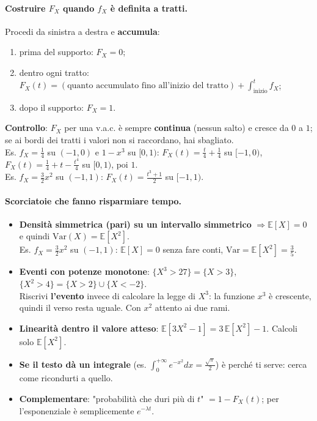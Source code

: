 \documentclass[12pt]{extarticle} %
\begin{document}
\paragraph{Costruire $F_X$ quando $f_X$ è definita a tratti.} Procedi da sinistra a destra e \textbf{accumula}:
\begin{enumerate}
    \item prima del supporto: $F_X = 0$;
    \item dentro ogni tratto: $F_X(t) = (\text{quanto accumulato fino all'inizio del tratto}) + \int_{\text{inizio}}^{t} f_X$;
    \item dopo il supporto: $F_X = 1$.
\end{enumerate}
{\footnotesize \textbf{Controllo}: $F_X$ per una v.a.c. è sempre \textbf{continua} (nessun salto) e cresce da $0$ a $1$; se ai bordi dei tratti i valori non si raccordano, hai sbagliato. \\
Es. $f_X = \frac14$ su $(-1,0)$ e $1-x^3$ su $[0,1)$: \; $F_X(t) = \frac{t}{4} + \frac14$ su $[-1,0)$, \; $F_X(t) = \frac14 + t - \frac{t^4}{4}$ su $[0,1)$, poi $1$. \\
Es. $f_X = \frac32 x^2$ su $(-1,1)$: \; $F_X(t) = \frac{t^3+1}{2}$ su $[-1,1)$.}

\paragraph{Scorciatoie che fanno risparmiare tempo.}
\begin{itemize}
    \item \textbf{Densità simmetrica (pari) su un intervallo simmetrico} $\Rightarrow \mathbb{E}[X] = 0$ e quindi $\mathrm{Var}(X) = \mathbb{E}[X^2]$. \\ {\footnotesize Es. $f_X = \frac32 x^2$ su $(-1,1)$: $\mathbb{E}[X]=0$ senza fare conti, $\mathrm{Var} = \mathbb{E}[X^2] = \frac35$.}
    \item \textbf{Eventi con potenze monotone}: $\{X^3 > 27\} = \{X > 3\}$, $\{X^2 > 4\} = \{X>2\} \cup \{X<-2\}$. \\ {\footnotesize Riscrivi \textbf{l'evento} invece di calcolare la legge di $X^3$: la funzione $x^3$ è crescente, quindi il verso resta uguale. Con $x^2$ attento ai due rami.}
    \item \textbf{Linearità dentro il valore atteso}: $\mathbb{E}[3X^2 - 1] = 3\,\mathbb{E}[X^2] - 1$. Calcoli solo $\mathbb{E}[X^2]$.
    \item \textbf{Se il testo dà un integrale} (es. $\int_0^{+\infty} e^{-x^2}dx = \frac{\sqrt\pi}{2}$) è perché ti serve: cerca come ricondurti a quello.
    \item \textbf{Complementare}: "probabilità che duri più di $t$" $= 1 - F_X(t)$; per l'esponenziale è semplicemente $e^{-\lambda t}$.
\end{itemize}
\end{document}
